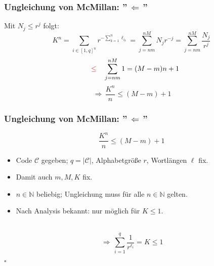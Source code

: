 \documentclass{beamer}
\begin{document}
\begin{frame}[t]
    \frametitle{Ungleichung von McMillan: ''$\,\Longleftarrow\,$''}
        Mit {$N_j \leq r^j$} folgt:
        $$
            K^n =
            \sum_{i\in [1,q]^n} r^{-\sum_{k=1}^{n} \ell_{i_k}}
            = \sum_{j = nm}^{nM} N_jr^{-j}
            = \sum_{j = nm}^{nM} \frac{N_j}{r^j}
        $$
        \pause
        $$
            \quad{\color{red}\leq}\quad \sum_{j = nm}^{nM} 1
            = (M-m)n + 1
        $$
        \pause
        $$
            \,\Longrightarrow\, \frac{K^n}{n} \leq (M-m) + 1
        $$
\end{frame}

\begin{frame}[t]
    \frametitle{Ungleichung von McMillan: ''$\,\Longleftarrow\,$''}
        $$
            \frac{K^n}{n} \leq (M-m) + 1
        $$
        \begin{itemize}
            \setlength\itemsep{1em}
            \item Code $\mathcal{C}$ gegeben; $q = |\mathcal{C}|$, Alphabetgröße $r$, Wortlängen $\ell$ fix.
            \item Damit auch $m,M,K$ fix.
            \pause
            \item $n \in \mathbb{N}$ beliebig; Ungleichung muss für alle $n \in \mathbb{N}$ gelten.
            \pause
            \item Nach Analysis bekannt: nur möglich für $K \leq 1$.
        \end{itemize}
        \strut\\[10pt]
        $$
            \,\Longrightarrow\, \sum_{i=1}^{q} \frac{1}{r^{\ell_i}} = K \leq 1
        $$
        \strut\hfill$\square$
\end{frame}
\end{document}
